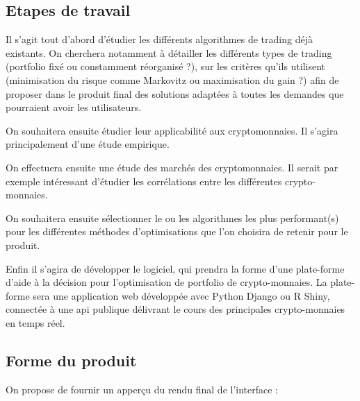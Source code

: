 \documentclass[a4paper]{article}
\begin{document}
\subsection{Etapes de travail}

Il s'agit tout d'abord d'étudier les différents algorithmes de trading déjà existants. On cherchera notamment à détailler les différents types de trading (portfolio fixé ou constamment réorganisé ?), sur les critères qu'ils utilisent (minimisation du risque comme Markovitz ou maximisation du gain ?) afin de proposer dans le produit final des solutions adaptées à toutes les demandes que pourraient avoir les utilisateurs.

On souhaitera ensuite étudier leur applicabilité aux cryptomonnaies. Il s'agira principalement d'une étude empirique.

On effectuera ensuite une étude des marchés des cryptomonnaies. Il serait par exemple intéressant d'étudier les corrélations entre les différentes crypto-monnaies.

On souhaitera ensuite sélectionner le ou les algorithmes les plus performant(s) pour les différentes méthodes d'optimisations que l'on choisira de retenir pour le produit.

Enfin il s'agira de développer le logiciel, qui prendra la forme d’une plate-forme d’aide à la décision pour l’optimisation de portfolio de crypto-monnaies. La plate-forme sera une application web développée avec Python Django ou R Shiny, connectée à une api publique délivrant le cours des principales crypto-monnaies en temps réel.

\subsection{Forme du produit}

On propose de fournir un apperçu du rendu final de l'interface :
\end{document}
